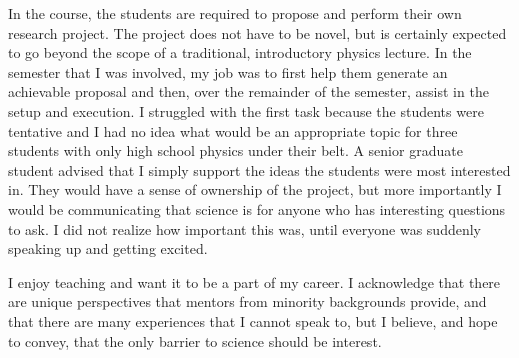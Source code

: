\documentclass[12pt]{article}
\begin{document}
In the course, the students are required to propose and perform their own research project. 
The project does not have to be novel, but is certainly expected to go beyond the scope of a traditional, introductory physics lecture.
In the semester that I was involved, my job was to first help them generate an achievable proposal and then, over the remainder of the semester, assist in the setup and execution.
I struggled with the first task because the students were tentative and I had no idea what would be an appropriate topic for three students with only high school physics under their belt.
A senior graduate student advised that I simply support the ideas the students were most interested in. They would have a sense of ownership of the project,
but more importantly I would be communicating that science is for anyone who has interesting questions to ask.
I did not realize how important this was, until everyone was suddenly speaking up and getting excited.

I enjoy teaching and want it to be a part of my career.
I acknowledge that there are unique perspectives that mentors from minority backgrounds provide, and that there are many experiences that I cannot speak to, but I believe, and hope to convey, that the only barrier to science should be interest.
\end{document}
